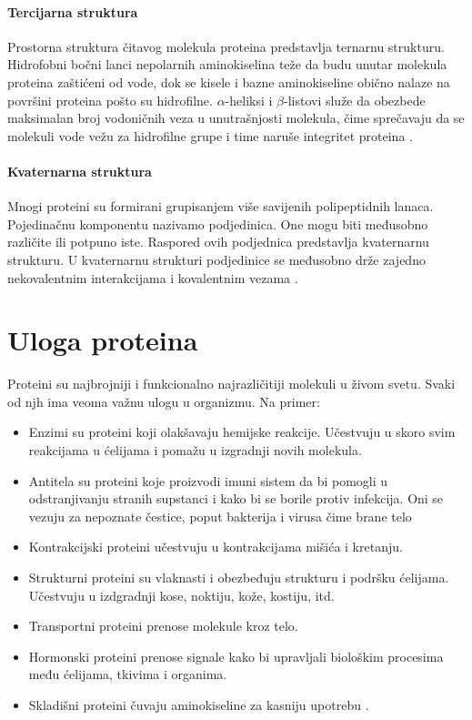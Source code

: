 \paragraph{Tercijarna struktura} 
Prostorna struktura čitavog molekula proteina predstavlja ternarnu strukturu. Hidrofobni bočni lanci nepolarnih aminokiselina teže da budu unutar molekula proteina zaštićeni od vode, dok se kisele i bazne aminokiseline obično nalaze na površini proteina pošto su hidrofilne. $\alpha$-heliksi i $\beta$-listovi služe da obezbede maksimalan broj vodoničnih veza u unutrašnjosti molekula, čime sprečavaju da se molekuli vode vežu za hidrofilne grupe i time naruše integritet proteina \cite{biochemestry5, biohUdz}.


\paragraph{Kvaternarna struktura} Mnogi proteini su formirani grupisanjem više savijenih polipeptidnih lanaca. Pojedinačnu komponentu nazivamo podjedinica. One mogu biti međusobno različite ili potpuno iste. Raspored ovih podjednica predstavlja kvaternarnu strukturu.  U kvaternarnu strukturi podjedinice se međusobno drže zajedno nekovalentnim interakcijama i kovalentnim vezama  \cite{doktJK, biochemestry5, PSF}.


\section{Uloga proteina}


Proteini su najbrojniji i funkcionalno najrazličitiji molekuli u živom svetu. Svaki od njh ima veoma važnu ulogu u organizmu. Na primer:

\begin{itemize}
	\item Enzimi su proteini koji olakšavaju hemijske reakcije. Učestvuju u skoro svim reakcijama u ćelijama i pomažu u izgradnji novih molekula.
	
	\item Antitela su proteini koje proizvodi imuni sistem da bi pomogli u odstranjivanju stranih supstanci i kako bi se borile protiv infekcija. Oni se vezuju za nepoznate čestice, poput bakterija i virusa čime brane telo 
	
	\item Kontrakcijski proteini učestvuju u kontrakcijama mišića i kretanju.
	
	\item Strukturni proteini su vlaknasti i obezbeđuju strukturu i podršku ćelijama. Učestvuju u izdgradnji kose, noktiju, kože, kostiju, itd.
	
	\item Transportni proteini prenose molekule kroz telo.
	
	\item Hormonski proteini prenose signale kako bi upravljali biološkim procesima među ćelijama, tkivima i organima.
	
	\item Skladišni proteini čuvaju aminokiseline za kasniju upotrebu \cite{fspOnl, roleOnl, nlmOnl}.
	
\end{itemize}
 
 

